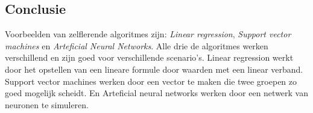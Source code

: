 \subsection{Conclusie}
Voorbeelden van zelflerende algoritmes zijn: \textit{Linear regression}, \textit{Support vector machines} en \textit{Arteficial Neural Networks}. Alle drie de algoritmes werken verschillend en zijn goed voor verschillende scenario's. Linear regression werkt door het opstellen van een lineare formule door waarden met een linear verband. Support vector machines werken door een vector te maken die twee groepen zo goed mogelijk scheidt. En Arteficial neural networks werken door een netwerk van neuronen te simuleren.
